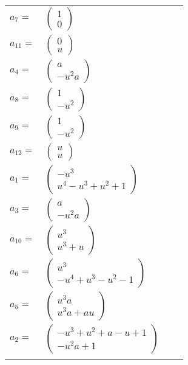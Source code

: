 \documentclass[1p]{elsarticle_modified}
\theoremstyle{definition}
\begin{document}
\begin{tabular}{m{7pt} m{180pt} m{7pt} m{180pt} }
\flushright $a_{7}=$&$\begin{pmatrix}1\\0\end{pmatrix}$ \\
\flushright $a_{11}=$&$\begin{pmatrix}0\\u\end{pmatrix}$ \\
\flushright $a_{4}=$&$\begin{pmatrix}a\\- u^2 a\end{pmatrix}$ \\
\flushright $a_{8}=$&$\begin{pmatrix}1\\- u^2\end{pmatrix}$ \\
\flushright $a_{9}=$&$\begin{pmatrix}1\\- u^2\end{pmatrix}$ \\
\flushright $a_{12}=$&$\begin{pmatrix}u\\u\end{pmatrix}$ \\
\flushright $a_{1}=$&$\begin{pmatrix}- u^3\\u^4- u^3+u^2+1\end{pmatrix}$ \\
\flushright $a_{3}=$&$\begin{pmatrix}a\\- u^2 a\end{pmatrix}$ \\
\flushright $a_{10}=$&$\begin{pmatrix}u^3\\u^3+u\end{pmatrix}$ \\
\flushright $a_{6}=$&$\begin{pmatrix}u^3\\- u^4+u^3- u^2-1\end{pmatrix}$ \\
\flushright $a_{5}=$&$\begin{pmatrix}u^3 a\\u^3 a+a u\end{pmatrix}$ \\
\flushright $a_{2}=$&$\begin{pmatrix}- u^3+u^2+a- u+1\\- u^2 a+1\end{pmatrix}$\\&\end{tabular}
\end{document}
